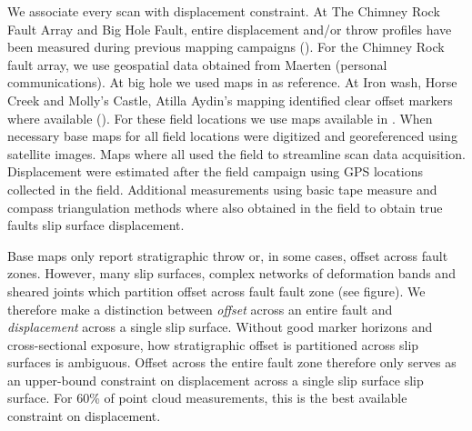 \documentclass[12pt,a4paper]{article}
\begin{document}
We associate every scan with displacement constraint. At The Chimney Rock Fault Array and Big Hole Fault, entire displacement and/or throw profiles have been measured during previous mapping campaigns (\cite{krantz1986orthorhombic, krantz1989orthorhombic, maerten2001digital, shipton2001damage}). For the Chimney Rock fault array, we use geospatial data obtained from Maerten (personal communications). At big hole we used maps in \cite{shipton2001damage} as reference. At Iron wash, Horse Creek and Molly’s Castle, Atilla Aydin’s mapping identified clear offset markers where available (\cite{aydin1977faulting}). For these field locations we use maps available in \cite{aydin1977faulting}. When necessary base maps for all field locations were digitized and georeferenced using satellite images. Maps where all used the field to streamline scan data acquisition. Displacement were estimated after the field campaign using GPS locations collected in the field. Additional measurements using basic tape measure and compass triangulation methods where also obtained in the field to obtain true faults slip surface displacement.  

Base maps only report stratigraphic throw or, in some cases, offset across fault zones. However, many slip surfaces, complex networks of deformation bands and sheared joints which partition offset across fault fault zone (see figure). We therefore make a distinction between \textit{offset} across an entire fault and \textit{displacement} across a single slip surface. Without good marker horizons and cross-sectional exposure, how stratigraphic offset is partitioned across slip surfaces is ambiguous. Offset across the entire fault zone therefore only serves as an upper-bound constraint on displacement across a single slip surface slip surface. For 60\% of point cloud measurements, this is the best available constraint on displacement. 
\end{document}
